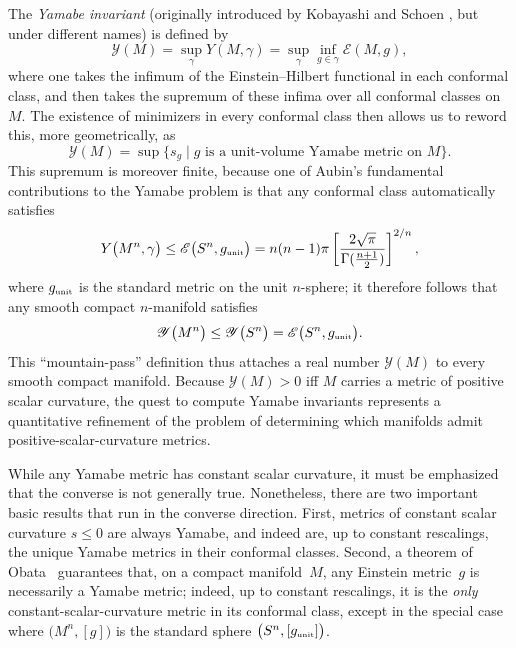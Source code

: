 \documentclass[pdftex]{sigma}
\numberwithin{equation}{section}
\begin{document}
The {\em Yamabe invariant} (originally introduced by Kobayashi \cite{okob} and Schoen \cite{sch}, but under different names)
is defined by
\begin{equation*}
\mathscr{Y}(M) = \sup_\gamma Y(M, \gamma ) = \sup_\gamma \inf_{g\in \gamma} \mathscr{E} (M, g),
\end{equation*}
where one takes the infimum of the Einstein--Hilbert functional in each conformal class, and then takes the supremum of these infima over
 all conformal classes on $M$.
The existence of minimizers in every conformal class then allows us to reword this, more geometrically, as
\begin{equation*}
\mathscr{Y}(M) = \sup \{ s_g \mid g \text{ is a unit-volume Yamabe metric on } M \}.
\end{equation*}
This supremum is moreover finite, because one of Aubin's fundamental contributions to the Yamabe problem
is that any conformal class automatically satisfies
\begin{equation*}
{Y}\big(M^n, \gamma \big) \leq \mathscr{E}\big(S^n, g_{\text{\tiny unit}} \big)= n(n-1)\pi \left[
\frac{2\sqrt{\pi}}{\Gamma (\frac{n+1}{2})}
\right]^{2/n},
\end{equation*}
where $g_{\text{\tiny unit}}$ is the standard metric on the unit $n$-sphere; it therefore follows that any
smooth compact $n$-manifold satisfies
\begin{equation*}
\mathscr{Y}\big(M^n \big) \leq \mathscr{Y}\big(S^n \big)= \mathscr{E}\big(S^n, g_{\text{\tiny unit}} \big).
\end{equation*}
This ``mountain-pass'' definition thus attaches
a real number $\mathscr{Y}(M)$ to every smooth compact manifold.
Because $\mathscr{Y}(M)>0$ iff $M$ carries a metric of positive scalar curvature,
 the quest to compute Yamabe invariants represents a %
 quantitative refinement of the problem
of determining which manifolds admit positive-scalar-curvature metrics.

While any Yamabe metric has constant scalar curvature, it must be emphasized that the converse is not generally true.
Nonetheless, there are two important basic results that run in the converse direction.
First, metrics of constant scalar curvature $s\leq 0$ are always Yamabe, and indeed are, up to constant rescalings,
 the unique Yamabe metrics in their conformal classes. Second, a theorem of Obata~\cite{obata} guarantees that, on a compact manifold~$M$, any Einstein metric~$g$
is necessarily a Yamabe metric; indeed, up to constant rescalings, it is the {\em only} constant-scalar-curvature metric in its conformal class,
except in the special case where $\big(M^n, [g]\big)$ is the standard sphere $\big(S^n, [g_{\text{\tiny unit}}]\big)$.
\end{document}

